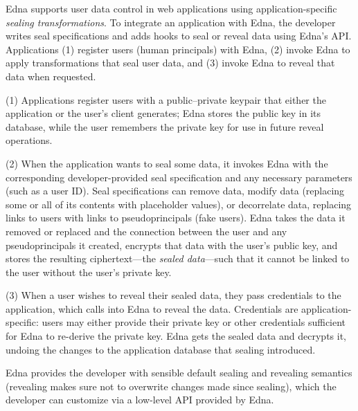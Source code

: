 %
Edna supports user data control in web applications using
application-specific \emph{sealing transformations}.
%
To integrate an application with Edna, the developer writes seal
specifications and adds hooks to seal or reveal data using Edna's API.
%
Applications (1) register users (human principals) with Edna, (2) invoke Edna to apply
transformations that seal user data, and (3) invoke Edna to reveal that data
when requested.

(1) Applications register users with a public--private keypair
that either the application or the user's client generates; Edna stores the
public key in its database, while the user remembers the private key for use in
future reveal operations.
%

%
(2) When the application wants to seal some data, it invokes Edna with the
corresponding developer-provided seal specification and any necessary
parameters (such as a user ID).
%
Seal specifications can remove data, modify data (replacing some or all of its
contents with placeholder values), or decorrelate data, replacing
links to users with links to pseudoprincipals (fake users).
%
Edna takes the data it removed or replaced and the connection between
the user and any pseudoprincipals it created, encrypts that data with the user's
public key, and stores the resulting ciphertext---the \emph{sealed
data}---such that it cannot be linked to
the user without the user's private key.
%

%
(3) When a user wishes to reveal their sealed data, they pass credentials
to the application, which calls into Edna to reveal the data.
%
Credentials are application-specific: users may either provide their private
key or other credentials sufficient for Edna to re-derive the private key.
%
Edna gets the sealed data and decrypts it, undoing the changes to the
application database that sealing introduced.

%
Edna provides the developer with sensible default sealing and revealing
semantics (\eg revealing makes sure not to overwrite changes made since
sealing), which the developer can customize via a low-level API provided by
Edna.


